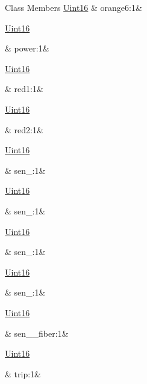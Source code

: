 \begin{DoxyFields}{Class Members}
\hypertarget{a00001_a565f4019bedbcec8454d0e9358e9847c}{\hyperlink{a00001_aae7407b021d43f7193a81a58cfb3e297}{Uint16}}\label{a00001_a565f4019bedbcec8454d0e9358e9847c}
&
orange6\+:1&
\\
\hline

\hypertarget{a00001_a62cd275989e78ee56a81f0265a87562e}{\hyperlink{a00001_aae7407b021d43f7193a81a58cfb3e297}{Uint16}}\label{a00001_a62cd275989e78ee56a81f0265a87562e}
&
power\+:1&
\\
\hline

\hypertarget{a00001_a9d579c86a5f8f42a0e051a5e0981a394}{\hyperlink{a00001_aae7407b021d43f7193a81a58cfb3e297}{Uint16}}\label{a00001_a9d579c86a5f8f42a0e051a5e0981a394}
&
red1\+:1&
\\
\hline

\hypertarget{a00001_ac8879b476eab41cd8fb93a844e42f428}{\hyperlink{a00001_aae7407b021d43f7193a81a58cfb3e297}{Uint16}}\label{a00001_ac8879b476eab41cd8fb93a844e42f428}
&
red2\+:1&
\\
\hline

\hypertarget{a00001_a226219dc5b8b7d5e5d1e7cf59aff4981}{\hyperlink{a00001_aae7407b021d43f7193a81a58cfb3e297}{Uint16}}\label{a00001_a226219dc5b8b7d5e5d1e7cf59aff4981}
&
sen\+\_\+:1&
\\
\hline

\hypertarget{a00001_a7111d63086b336f186d5c29829ed8852}{\hyperlink{a00001_aae7407b021d43f7193a81a58cfb3e297}{Uint16}}\label{a00001_a7111d63086b336f186d5c29829ed8852}
&
sen\+\_\+:1&
\\
\hline

\hypertarget{a00001_a25b93705f9c83a019eb4874d5e07cafd}{\hyperlink{a00001_aae7407b021d43f7193a81a58cfb3e297}{Uint16}}\label{a00001_a25b93705f9c83a019eb4874d5e07cafd}
&
sen\+\_\+:1&
\\
\hline

\hypertarget{a00001_a38b5fd085b51b918ed87978af504d2ef}{\hyperlink{a00001_aae7407b021d43f7193a81a58cfb3e297}{Uint16}}\label{a00001_a38b5fd085b51b918ed87978af504d2ef}
&
sen\+\_\+:1&
\\
\hline

\hypertarget{a00001_a238abb226189c55f050de19fd0b15dd4}{\hyperlink{a00001_aae7407b021d43f7193a81a58cfb3e297}{Uint16}}\label{a00001_a238abb226189c55f050de19fd0b15dd4}
&
sen\+\_\+\_\+fiber\+:1&
\\
\hline

\hypertarget{a00001_a7da7993d1249cb28b4e0c3e8524d15d2}{\hyperlink{a00001_aae7407b021d43f7193a81a58cfb3e297}{Uint16}}\label{a00001_a7da7993d1249cb28b4e0c3e8524d15d2}
&
trip\+:1&
\\
\hline

\end{DoxyFields}
\label{d9/d47/a00129}
\hypertarget{a00001_d9/d47/a00129}{}
